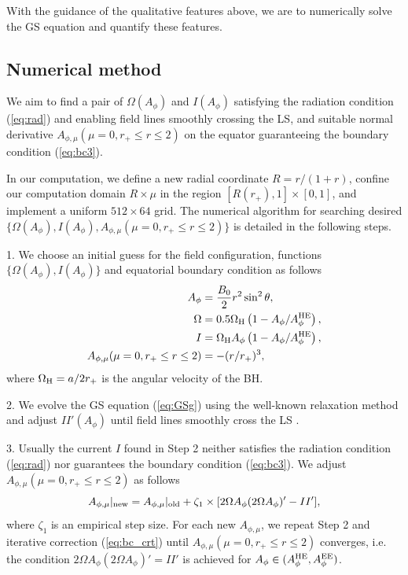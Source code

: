 \documentclass[aps,prd,reprint,nofootinbib, superscriptaddress]{revtex4-1}
\def\sst{\sin^2\theta}
\def\Ap{A_\phi}
\def\Am{A_{\phi,\mu}}
\def\be{\begin{equation}}
\def\ee{\end{equation}}
\def\WH{\Omega_{\rm H}}
\def\AHE{A_\phi^{\rm HE}}
\begin{document}
With the guidance of the qualitative features above, we are to numerically
solve the GS equation and quantify these features.

\subsection{Numerical method}
We aim to find a pair of $\Omega(A_\phi)$ and $I(A_\phi)$ satisfying the radiation condition (\ref{eq:rad})
and enabling field lines smoothly crossing the LS,
and suitable normal derivative $\Am(\mu =0, r_+\leq r \leq 2)$ on the equator
guaranteeing the boundary condition (\ref{eq:bc3}).

In our computation, we define a new radial coordinate $R=r/(1+r)$, confine our
computation domain $R\times \mu$ in the region $[R(r_+), 1]\times [0,1]$,
and implement a uniform $512\times 64$ grid. The numerical algorithm for
searching desired $\{\Omega(A_\phi), I(A_\phi), \Am(\mu =0, r_+\leq r \leq 2)\}$ is detailed
in the following steps.

1. We choose an initial guess for the field configuration, functions
$\{ \Omega(\Ap), I(\Ap)\}$
and equatorial boundary condition as follows
\begin{subequations}
\begin{align}
    \Ap &= \frac{B_0}{2}r^2 \sst,  \label{eq:gss1} \\
    \Omega & = 0.5\WH\left(1-\Ap/\AHE\right),  \label{eq:gss2}\\
    I & = \WH \Ap\left(1-\Ap/\AHE\right) , \\
    \Am(\mu =0, r_+\leq r \leq 2) & = - (r/r_+)^3, \label{eq:gss3}
\end{align}
\end{subequations}
where $\WH = a/2r_+$ is the angular velocity of the BH.

2. We evolve the GS equation (\ref{eq:GSg}) using the well-known relaxation method \cite{Press1987}
 and adjust $II'(\Ap)$ until  field lines smoothly cross the LS
\cite[see e.g.][for more details]{Contopoulos2013, Nathanail2014, Pan2016a, Mahlmann2018}.

3. Usually the current $I$ found in Step 2 neither satisfies the radiation condition (\ref{eq:rad})
nor guarantees the boundary condition (\ref{eq:bc3}). We  adjust
$\Am(\mu = 0, r_+ \leq r\leq 2)$ as follows
\be
\label{eq:bc_crt}
 A_{\phi,\mu}|_{\rm new}  = A_{\phi,\mu}|_{\rm old} + \zeta_1\times[2\Omega\Ap(2\Omega\Ap)' -II'],
\ee
where $\zeta_1$ is an empirical step size. For each new $A_{\phi,\mu}$, we repeat Step 2 and iterative
correction (\ref{eq:bc_crt}) until $\Am(\mu = 0, r_+ \leq r\leq 2)$ converges, i.e. the condition $2\Omega\Ap(2\Omega\Ap)' = II'$ is
achieved for $A_\phi\in (A_\phi^{\rm HE}, A_\phi^{\rm EE})$.
\end{document}
